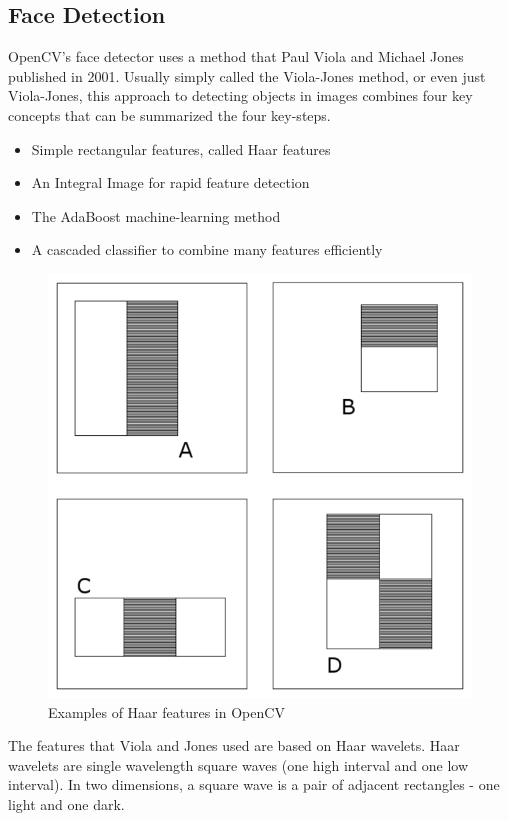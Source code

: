 \documentclass[12pt]{article}			%
\begin{document}
\subsection{ Face Detection }
OpenCV's face detector uses a method that Paul Viola and Michael Jones published in 2001\cite{Viola01}. Usually simply called the Viola-Jones method, or even just Viola-Jones, this approach to detecting objects in images combines four key concepts that can be summarized the four key-steps.
\begin{itemize}
	\item Simple rectangular features, called Haar features
	\item An Integral Image for rapid feature detection
	\item The AdaBoost machine-learning method
	\item A cascaded classifier to combine many features efficiently
\end{itemize}
\begin{figure}
	\centering
	\includegraphics[scale=0.3]{img/fd5.png}
	\caption{Examples of Haar features in OpenCV}
	\label{fig:fd1}
\end{figure}
The features that Viola and Jones used are based on Haar wavelets. Haar wavelets are single wavelength square waves (one high interval and one low interval). In two dimensions, a square wave is a pair of adjacent rectangles - one light and one dark.\\
\end{document}

